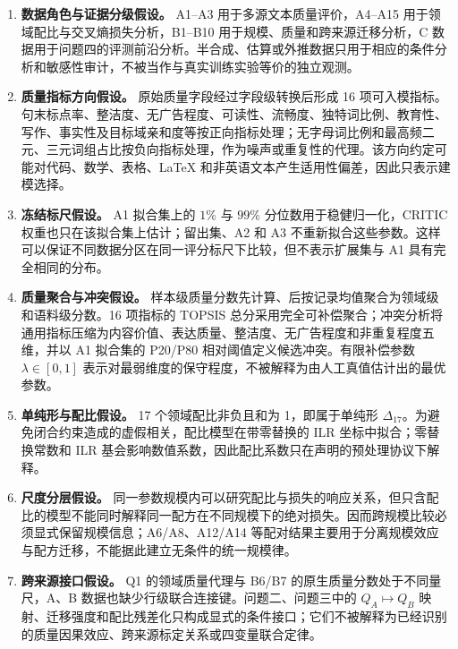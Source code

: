 \begin{enumerate}
  \item \textbf{数据角色与证据分级假设。} A1--A3 用于多源文本质量评价，A4--A15 用于领域配比与交叉熵损失分析，B1--B10 用于规模、质量和跨来源迁移分析，C 数据用于问题四的评测前沿分析。半合成、估算或外推数据只用于相应的条件分析和敏感性审计，不被当作与真实训练实验等价的独立观测。

  \item \textbf{质量指标方向假设。} 原始质量字段经过字段级转换后形成 16 项可入模指标。句末标点率、整洁度、无广告程度、可读性、流畅度、独特词比例、教育性、写作、事实性及目标域亲和度等按正向指标处理；无字母词比例和最高频二元、三元词组占比按负向指标处理，作为噪声或重复性的代理。该方向约定可能对代码、数学、表格、LaTeX 和非英语文本产生适用性偏差，因此只表示建模选择。

  \item \textbf{冻结标尺假设。} A1 拟合集上的 $1\%$ 与 $99\%$ 分位数用于稳健归一化，CRITIC 权重也只在该拟合集上估计；留出集、A2 和 A3 不重新拟合这些参数。这样可以保证不同数据分区在同一评分标尺下比较，但不表示扩展集与 A1 具有完全相同的分布。

  \item \textbf{质量聚合与冲突假设。} 样本级质量分数先计算、后按记录均值聚合为领域级和语料级分数。16 项指标的 TOPSIS 总分采用完全可补偿聚合；冲突分析将通用指标压缩为内容价值、表达质量、整洁度、无广告程度和非重复程度五维，并以 A1 拟合集的 P20/P80 相对阈值定义候选冲突。有限补偿参数 $\lambda\in[0,1]$ 表示对最弱维度的保守程度，不被解释为由人工真值估计出的最优参数。

  \item \textbf{单纯形与配比假设。} 17 个领域配比非负且和为 1，即属于单纯形 $\Delta_{17}$。为避免闭合约束造成的虚假相关，配比模型在带零替换的 ILR 坐标中拟合；零替换常数和 ILR 基会影响数值系数，因此配比系数只在声明的预处理协议下解释。

  \item \textbf{尺度分层假设。} 同一参数规模内可以研究配比与损失的响应关系，但只含配比的模型不能同时解释同一配方在不同规模下的绝对损失。因而跨规模比较必须显式保留规模信息；A6/A8、A12/A14 等配对结果主要用于分离规模效应与配方迁移，不能据此建立无条件的统一规模律。

  \item \textbf{跨来源接口假设。} Q1 的领域质量代理与 B6/B7 的原生质量分数处于不同量尺，A、B 数据也缺少行级联合连接键。问题二、问题三中的 $Q_A\mapsto Q_B$ 映射、迁移强度和配比残差化只构成显式的条件接口；它们不被解释为已经识别的质量因果效应、跨来源标定关系或四变量联合定律。


\end{enumerate}
